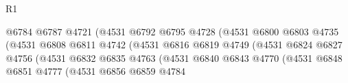 \begin{lexlean}{R1}
\begin{coremodule}
                                                    @6784
                                                    @6787
                                                    @4721
                                                    (@4531
                                                      @6792
                                                      @6795
                                                      @4728
                                                      (@4531
                                                        @6800
                                                        @6803
                                                        @4735
                                                        (@4531
                                                          @6808
                                                          @6811
                                                          @4742
                                                          (@4531
                                                            @6816
                                                            @6819
                                                            @4749
                                                            (@4531
                                                              @6824
                                                              @6827
                                                              @4756
                                                              (@4531
                                                                @6832
                                                                @6835
                                                                @4763
                                                                (@4531
                                                                  @6840
                                                                  @6843
                                                                  @4770
                                                                  (@4531
                                                                    @6848
                                                                    @6851
                                                                    @4777
                                                                    (@4531
                                                                      @6856
                                                                      @6859
                                                                      @4784

\end{coremodule}
\end{lexlean}
